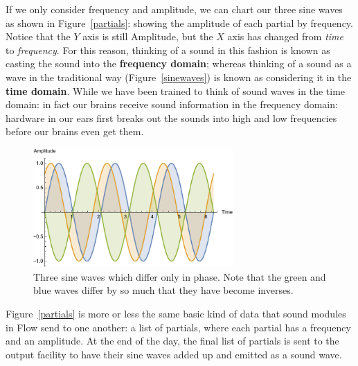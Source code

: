 \documentclass{article}
\newcommand\name{Flow}
\begin{document}
If we only consider frequency and amplitude, we can chart our three sine waves as shown in Figure~\ref{partials}: showing the amplitude of each partial by frequency.  Notice that the \(Y\) axis is still Amplitude, but the \(X\) axis has changed from {\it time} to {\it frequency}. For this reason, thinking of a sound in this fashion is known as casting the sound into the {\bf frequency domain}; whereas thinking of a sound as a wave in the traditional way (Figure~\ref{sinewaves}) is known as considering it in the {\bf time domain}.  While we have been trained to think of sound waves in the time domain: in fact our brains receive sound information in the frequency domain: hardware in our ears first breaks out the sounds into high and low frequencies before our brains even get them.

\begin{figure}
\includegraphics[width=3in]{phases}
\caption{Three sine waves which differ only in phase.  Note that the green and blue waves differ by so much that they have become inverses.}
\label{phases}
\vspace{-1em}
\end{figure}

Figure~\ref{partials} is more or less the same basic kind of data that sound modules in {\name} send to one another: a list of partials, where each partial has a frequency and an amplitude.  At the end of the day, the final list of partials is sent to the output facility to have their sine waves added up and emitted as a sound wave.
\end{document}
